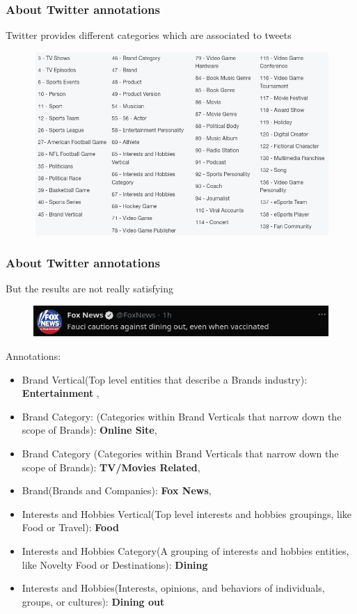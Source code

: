\documentclass{beamer}
\begin{document}
\begin{frame}[c]
    \frametitle{About Twitter annotations}
    Twitter provides different categories which are associated to tweets

    \begin{figure}[htpb]
        \centering
        \includegraphics[width=0.8\linewidth]{img/twitter-categories.png}
    \end{figure}
\end{frame}

\begin{frame}[c]
    \frametitle{About Twitter annotations}
    But the results are not really satisfying

    \begin{figure}[htpb]
        \centering
        \includegraphics[width=0.8\linewidth]{img/twitter-fauci.png}
    \end{figure}

    Annotations:
    \begin{itemize}
        \item Brand Vertical(Top level entities that describe a Brands industry):
            \textbf{Entertainment} , 
        \item Brand Category: (Categories within Brand Verticals that narrow down the
            scope of Brands): \textbf{Online Site},
        \item Brand Category (Categories within Brand Verticals that narrow
            down the scope of Brands): \textbf{TV/Movies Related},
        \item Brand(Brands and Companies): \textbf{Fox News},
        \item Interests and Hobbies Vertical(Top level interests and hobbies groupings,
            like Food or Travel): \textbf{Food}
        \item Interests and Hobbies Category(A grouping of interests and hobbies
            entities, like Novelty Food or Destinations): \textbf{Dining}
        \item Interests and Hobbies(Interests, opinions, and behaviors of individuals,
            groups, or cultures): \textbf{Dining out}
    \end{itemize}
\end{frame}
\end{document}
